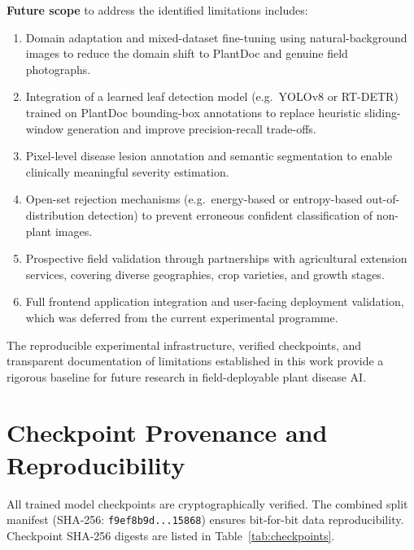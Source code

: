 \documentclass[pdflatex,sn-mathphys-num]{sn-jnl}
\theoremstyle{thmstyleone}%
\theoremstyle{thmstyletwo}%
\theoremstyle{thmstylethree}%
\begin{document}
\textbf{Future scope} to address the identified limitations includes:
\begin{enumerate}
  \item Domain adaptation and mixed-dataset fine-tuning using natural-background images
        to reduce the domain shift to PlantDoc and genuine field photographs.
  \item Integration of a learned leaf detection model (e.g.\ YOLOv8 or RT-DETR) trained
        on PlantDoc bounding-box annotations to replace heuristic sliding-window generation
        and improve precision-recall trade-offs.
  \item Pixel-level disease lesion annotation and semantic segmentation to enable
        clinically meaningful severity estimation.
  \item Open-set rejection mechanisms (e.g.\ energy-based or entropy-based out-of-distribution
        detection) to prevent erroneous confident classification of non-plant images.
  \item Prospective field validation through partnerships with agricultural extension
        services, covering diverse geographies, crop varieties, and growth stages.
  \item Full frontend application integration and user-facing deployment validation, which
        was deferred from the current experimental programme.
\end{enumerate}

The reproducible experimental infrastructure, verified checkpoints, and transparent
documentation of limitations established in this work provide a rigorous baseline for
future research in field-deployable plant disease AI.


\section*{Checkpoint Provenance and Reproducibility}

All trained model checkpoints are cryptographically verified. The combined split
manifest (SHA-256: \texttt{f9ef8b9d...15868}) ensures bit-for-bit data reproducibility.
Checkpoint SHA-256 digests are listed in Table~\ref{tab:checkpoints}.
\end{document}
